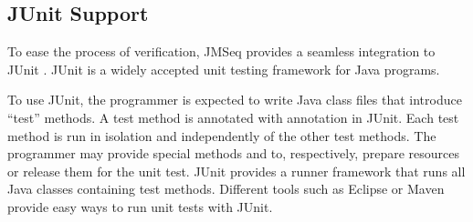 \subsection{JUnit Support} \label{sec:junit}
To ease the process of verification, JMSeq provides a seamless integration to JUnit \cite{JUnit}. 
JUnit is a widely accepted unit testing framework for Java programs.

To use JUnit, the programmer is expected to write Java class files that introduce ``test'' methods.
A test method is annotated with  annotation in JUnit.
Each test method is run in isolation and independently of the other test methods.
The programmer may provide special methods  and  to, respectively, prepare resources or release them for the unit test.
JUnit provides a runner framework that runs all Java classes containing test methods.
Different tools such as Eclipse \cite{eclipse_junit} or Maven \cite{maven_junit} provide easy ways to run unit tests with JUnit.

